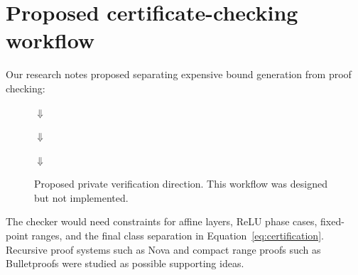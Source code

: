 \documentclass[11pt,a4paper]{report}
\begin{document}
\section{Proposed certificate-checking workflow}

Our research notes proposed separating expensive bound generation from proof checking:

\begin{figure}[H]
\centering


\vspace{0.18cm}
\(\Downarrow\)
\vspace{0.18cm}


\vspace{0.18cm}
\(\Downarrow\)
\vspace{0.18cm}


\vspace{0.18cm}
\(\Downarrow\)
\vspace{0.18cm}


\caption{Proposed private verification direction. This workflow was designed but not implemented.}
\label{fig:zk-flow}
\end{figure}

The checker would need constraints for affine layers, ReLU phase cases, fixed-point ranges, and the final class separation in Equation~\ref{eq:certification}. Recursive proof systems such as Nova \cite{kothapalli2022nova} and compact range proofs such as Bulletproofs \cite{bunz2018bulletproofs} were studied as possible supporting ideas.
\end{document}
